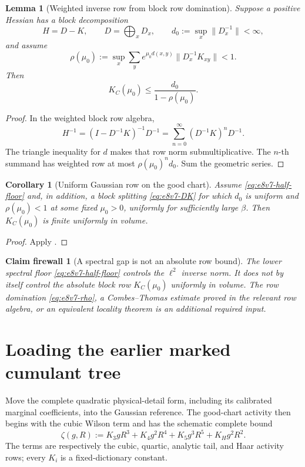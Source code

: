 \documentclass[11pt,oneside]{book}
\newtheorem{lemma}[theorem]{Lemma}
\newtheorem{corollary}[theorem]{Corollary}
\newtheorem{firewall}[theorem]{Claim firewall}
\theoremstyle{definition}
\theoremstyle{remark}
\begin{document}
\begin{lemma}[Weighted inverse row from block row domination]
\label{lem:e8v7-inverse-row}
Suppose a positive Hessian has a block decomposition
\[
 H=D-K,\qquad D=\bigoplus_xD_x,\qquad
 d_0:=\sup_x\|D_x^{-1}\|<\infty,                    \label{eq:e8v7-DK}
\]
and assume
\[
 \rho(\mu_0):=
 \sup_x\sum_y e^{\mu_0d(x,y)}
 \|D_x^{-1}K_{xy}\|<1.                              \label{eq:e8v7-rho}
\]
Then
\[
 K_C(\mu_0)\le
 \frac{d_0}{1-\rho(\mu_0)}.                         \label{eq:e8v7-KC-bound}
\]
\end{lemma}

\begin{proof}
In the weighted block row algebra,
\[
 H^{-1}=(I-D^{-1}K)^{-1}D^{-1}
 =\sum_{n=0}^\infty(D^{-1}K)^nD^{-1}.
\]
The triangle inequality for \(d\) makes that row norm
submultiplicative.  The \(n\)-th summand has weighted row at most
\(\rho(\mu_0)^nd_0\).  Sum the geometric series.
\end{proof}

\begin{corollary}[Uniform Gaussian row on the good chart]
\label{cor:e8v7-uniform-Gaussian}
Assume \eqref{eq:e8v7-half-floor} and, in addition, a block splitting
\eqref{eq:e8v7-DK} for which \(d_0\) is uniform and
\(\rho(\mu_0)<1\) at some fixed \(\mu_0>0\), uniformly for
sufficiently large \(\beta\).  Then \(K_C(\mu_0)\) is finite uniformly
in volume.
\end{corollary}

\begin{proof}
Apply .
\end{proof}

\begin{firewall}[A spectral gap is not an absolute row bound]
\label{fire:e8v7-gap-row}
The lower spectral floor \eqref{eq:e8v7-half-floor} controls the
\(\ell^2\) inverse norm.  It does not by itself control the absolute
block row \(K_C(\mu_0)\) uniformly in volume.  The row domination
\eqref{eq:e8v7-rho}, a Combes--Thomas estimate proved in the relevant
row algebra, or an equivalent locality theorem is an additional
required input.
\end{firewall}

\section{Loading the earlier marked cumulant tree}
\label{sec:e8v7-KP}

Move the complete quadratic physical-detail form, including its
calibrated marginal coefficients, into the Gaussian reference.  The
good-chart activity then begins with the cubic Wilson term and has
the schematic complete bound
\[
 \zeta(g,R)
 :=
 K_3gR^3+K_4g^2R^4+K_5g^3R^5
       +K_Hg^2R^2.                                  \label{eq:e8v7-zeta}
\]
The terms are respectively the cubic, quartic, analytic tail, and
Haar activity rows; every \(K_i\) is a fixed-dictionary constant.
\end{document}
